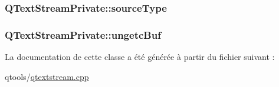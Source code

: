 \subsubsection[{source\+Type}]{ Q\+Text\+Stream\+Private\+::source\+Type}\label{class_q_text_stream_private_ad36a4145a8b62bed2dbf661b1e5f8aa7}
\hypertarget{class_q_text_stream_private_a5657edc4d5707027c62d9ef391749a39}{}
\subsubsection[{ungetc\+Buf}]{ Q\+Text\+Stream\+Private\+::ungetc\+Buf}\label{class_q_text_stream_private_a5657edc4d5707027c62d9ef391749a39}


La documentation de cette classe a été générée à partir du fichier suivant \+:\begin{DoxyCompactItemize}
\item 
qtools/\hyperlink{qtextstream_8cpp}{qtextstream.\+cpp}\end{DoxyCompactItemize}
